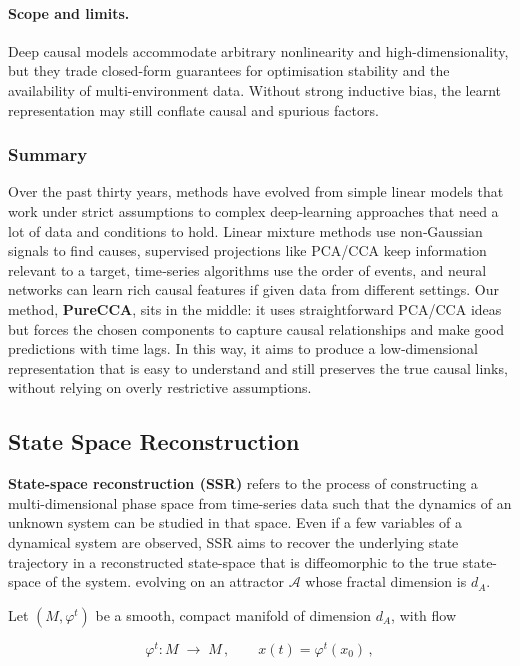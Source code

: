 \documentclass[14pt]{extarticle}
\begin{document}
	\paragraph{Scope and limits.}
	Deep causal models accommodate arbitrary nonlinearity and high-dimensionality, but they trade closed-form guarantees for optimisation stability and the availability of multi-environment data.  
	Without strong inductive bias, the learnt representation may still conflate causal and spurious factors.
	
	\subsubsection*{Summary}
	
	Over the past thirty years, methods have evolved from simple linear models that work under strict assumptions to complex deep‐learning approaches that need a lot of data and conditions to hold.  
	Linear mixture methods use non‐Gaussian signals to find causes, supervised projections like PCA/CCA keep information relevant to a target, time‐series algorithms use the order of events, and neural networks can learn rich causal features if given data from different settings.  
	Our method, \textbf{PureCCA}, sits in the middle: it uses straightforward PCA/CCA ideas but forces the chosen components to capture causal relationships and make good predictions with time lags.  
	In this way, it aims to produce a low‐dimensional representation that is easy to understand and still preserves the true causal links, without relying on overly restrictive assumptions.  

	\subsection{State Space Reconstruction}\label{sec:ssr}
	
	\textbf{State-space reconstruction (SSR)} refers to the process of constructing a multi-dimensional phase space from time-series data such that the dynamics of an unknown system can be studied in that space. 
	Even if a few variables of a dynamical system are observed, SSR aims to recover the underlying state trajectory  in a reconstructed state-space that is diffeomorphic to the true state-space of the system.
	evolving on an attractor $\mathcal{A}$ whose fractal dimension is $d_A$.  
	
	Let $(M, \varphi^t)$ be a smooth, compact manifold of dimension $d_A$, with flow
	
	$$
	\varphi^t\colon M\;\to\;M\,,\qquad x(t)=\varphi^t(x_0)\,,
	$$
	
\end{document}
